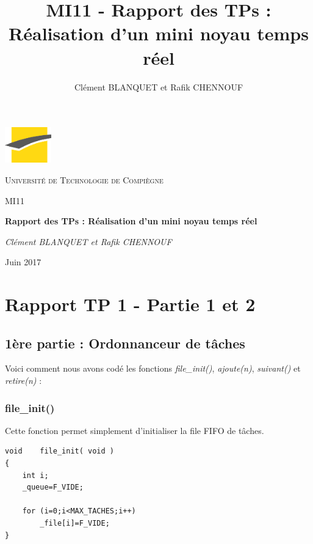 \documentclass[a4paper,12pt]{report}
\author{Clément BLANQUET et Rafik CHENNOUF}
\title{MI11 - Rapport des TPs : Réalisation d'un mini noyau temps réel}
\begin{document}
\begin{titlepage}

	\centering
	\includegraphics[width=0.15\textwidth]{sigle_UTC.jpg}\par\vspace{1cm}
	{\scshape\LARGE Université de Technologie de Compiègne \par\vspace{1cm}}	
	{\scshape\Large MI11\par}
	\vspace{1.5cm}
	{\huge\bfseries Rapport des TPs : Réalisation d'un mini noyau temps réel\par}
	\vspace{2cm}
	{\Large\itshape Clément BLANQUET et Rafik CHENNOUF\par}
	\vspace{2cm}
	\vfill
	{\large Juin 2017}
\end{titlepage}


\renewcommand{\contentsname}{Sommaire} %
\tableofcontents
\listoffigures        %




\chapter{Rapport TP 1 - Partie 1 et 2}

\section{1ère partie : Ordonnanceur de tâches}

Voici comment nous avons codé les fonctions \textit{file\_init()}, \textit{ajoute(n)}, \textit{suivant()} et \textit{retire(n)} :

\subsection{file\_init()}
Cette fonction permet simplement d'initialiser la file FIFO de tâches.
\begin{lstlisting}
void	file_init( void )
{
	int i;
	_queue=F_VIDE;

	for (i=0;i<MAX_TACHES;i++)
		_file[i]=F_VIDE;
}
\end{lstlisting}
\end{document}

